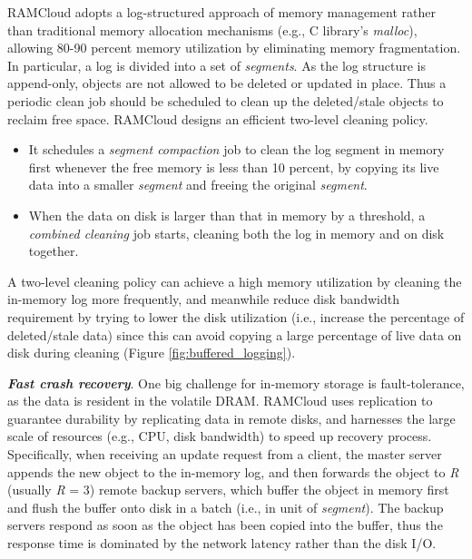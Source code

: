 \documentclass[twocolumn]{article}
\begin{document}
RAMCloud adopts a log-structured approach of memory management rather
than traditional memory allocation mechanisms (e.g., C library's
\emph{malloc}), allowing 80-90 percent memory utilization by eliminating
memory fragmentation. In particular, a log is divided into a set of
\emph{segments}. As the log structure is append-only, objects are not
allowed to be deleted or updated in place. Thus a periodic clean job
should be scheduled to clean up the deleted/stale objects to reclaim
free space. RAMCloud designs an efficient two-level cleaning policy.

\begin{itemize}
\item
  It schedules a \emph{segment compaction} job to clean the log segment
  in memory first whenever the free memory is less than 10 percent, by
  copying its live data into a smaller \emph{segment} and freeing the
  original \emph{segment}.
\item
  When the data on disk is larger than that in memory by a threshold, a
  \emph{combined cleaning} job starts, cleaning both the log in memory
  and on disk together.
\end{itemize}

A two-level cleaning policy can achieve a high memory utilization by
cleaning the in-memory log more frequently, and meanwhile reduce disk
bandwidth requirement by trying to lower the disk utilization (i.e.,
increase the percentage of deleted/stale data) since this can avoid
copying a large percentage of live data on disk during cleaning (Figure \ref{fig:buffered_logging}).

\noindent
\textbf{\emph{Fast crash recovery}}. One big challenge for in-memory storage is
fault-tolerance, as the data is resident in the volatile
DRAM. 
RAMCloud uses replication to guarantee durability by replicating data in remote disks,
and harnesses the large scale of resources (e.g., CPU, disk bandwidth)
to speed up recovery process. Specifically, when receiving an update
request from a client, the master server appends the new object to the
in-memory log, and then forwards the object to \emph{R} (usually
\emph{R} = 3) remote backup servers, which buffer the object in memory
first and flush the buffer onto disk in a batch (i.e., in unit of
\emph{segment}). The backup servers respond as soon as the object has
been copied into the buffer, thus the response time is dominated by the
network latency rather than the disk I/O.
\end{document}
